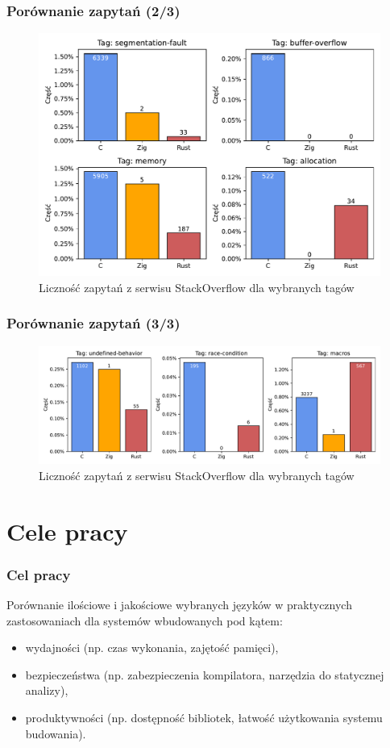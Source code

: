 \documentclass{beamer}
\begin{document}
\begin{frame}
	\frametitle{Porównanie zapytań (2/3)}

	\begin{figure}
		\includegraphics[width=\linewidth]{img/plots/issues-1.pdf}
		\caption{Liczność zapytań z serwisu StackOverflow dla wybranych tagów}
		\centering
	\end{figure}
\end{frame}

\begin{frame}
	\frametitle{Porównanie zapytań (3/3)}

	\begin{figure}
		\includegraphics[width=\linewidth]{img/plots/issues-2.pdf}
		\caption{Liczność zapytań z serwisu StackOverflow dla wybranych tagów}
		\centering
	\end{figure}
\end{frame}

\section{Cele pracy}

\begin{frame}
	\frametitle{Cel pracy}
	Porównanie ilościowe i jakościowe wybranych języków w praktycznych
	zastosowaniach dla systemów wbudowanych pod kątem:

	\begin{itemize}
		\item wydajności (np. czas wykonania, zajętość pamięci),
		\item bezpieczeństwa (np. zabezpieczenia kompilatora, narzędzia do
		      statycznej analizy),
		\item produktywności (np. dostępność bibliotek, łatwość
		      użytkowania systemu budowania).
	\end{itemize}
\end{frame}
\end{document}
